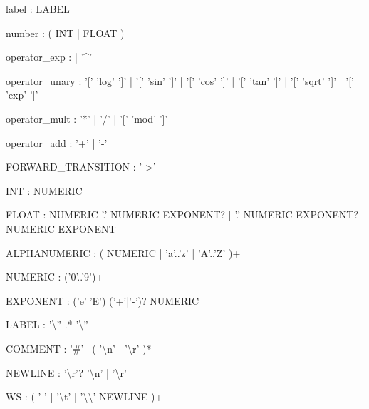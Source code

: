 \begin{bnfsource}
label :
  LABEL

number :
  ( INT | FLOAT )
  

operator_exp :
  | '^'

operator_unary :
  '[' 'log' ']'
  | '[' 'sin' ']'
  | '[' 'cos' ']'
  | '[' 'tan' ']'
  | '[' 'sqrt' ']'
  | '[' 'exp' ']'

operator_mult :
  '*' | '/' | '[' 'mod' ']'

operator_add :
  '+' | '-'


FORWARD_TRANSITION :
  '->'

INT :
  NUMERIC

FLOAT :
  NUMERIC '.' NUMERIC EXPONENT?
  | '.' NUMERIC EXPONENT?
  | NUMERIC EXPONENT

ALPHANUMERIC :
  ( NUMERIC | 'a'..'z' | 'A'..'Z' )+

NUMERIC :
  ('0'..'9')+
  
EXPONENT :
  ('e'|'E') ('+'|'-')? NUMERIC

LABEL :
  '{\textbackslash}'' .* '{\textbackslash}''

COMMENT :
  '#' ~( '{\textbackslash}n' | '{\textbackslash}r' )*

NEWLINE :
  '{\textbackslash}r'? '{\textbackslash}n' | '{\textbackslash}r'

WS :
  ( ' ' | '{\textbackslash}t' | '{\textbackslash}{\textbackslash}' NEWLINE )+
\end{bnfsource}
